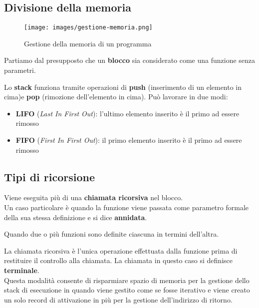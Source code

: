 \subsection{Divisione della memoria}
\begin{figure}[h!]
	\centering
	\texttt{[image: images/gestione-memoria.png]}
	\caption{Gestione della memoria di un programma}
\end{figure}
\begin{note}
	Partiamo dal presupposto che un \textbf{blocco} sia considerato come una funzione senza parametri.
\end{note}
\begin{note}
	Lo \textbf{stack} funziona tramite operazioni di \textbf{push} (inserimento di un elemento in cima)e \textbf{pop} (rimozione dell'elemento in cima). Può lavorare in due modi:
	\begin{itemize}
		\item  \textbf{LIFO} (\emph{Last In First Out}): l'ultimo elemento inserito è il primo ad essere rimosso
		\item  \textbf{FIFO} (\emph{First In First Out}): il primo elemento inserito è il primo ad essere rimosso
	\end{itemize} 
\end{note}

\subsection{Tipi di ricorsione}
\begin{definition}
	Viene eseguita più di una \textbf{chiamata ricorsiva} nel blocco. \\
	Un caso particolare è quando la funzione viene passata come parametro formale della sua stessa definizione e si dice \textbf{annidata}.
\end{definition}
\begin{definition}[Mutua]
	Quando due o più funzioni sono definite ciascuna in termini dell'altra.
\end{definition}
\begin{definition}[In coda]
	La chiamata ricorsiva è l'unica operazione effettuata dalla funzione prima di restituire il controllo alla chiamata. La chiamata in questo caso si definisce \textbf{terminale}.\\ Questa modalità consente di risparmiare spazio di memoria per la gestione dello stack di esecuzione in quando viene gestito come se fosse iterativo e viene creato un solo record di attivazione in più per la gestione dell'indirizzo di ritorno.
\end{definition}